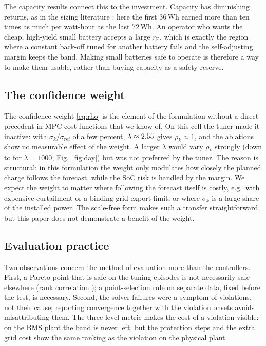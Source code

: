 \documentclass[a4paper,fleqn]{cas-dc}
\newcommand{\rE}{r_{\mathrm{E}}}
\begin{document}
The capacity results connect this to the investment. Capacity has diminishing returns, as in the sizing literature \cite{weniger2014sizing,quoilin2016quantifying,mulleriyawage2020optimally}: here the first 36\,Wh earned more than ten times as much per watt-hour as the last 72\,Wh. An operator who wants the cheap, high-yield small battery accepts a large $\rE$, which is exactly the region where a constant back-off tuned for another battery fails and the self-adjusting margin keeps the band. Making small batteries safe to operate is therefore a way to make them usable, rather than buying capacity as a safety reserve.

\subsection{The confidence weight}\label{sec:disc:rho}
The confidence weight \eqref{eq:rho} is the element of the formulation without a direct precedent in MPC cost functions that we know of. On this cell the tuner made it inactive: with $\sigma_k/\sigma_{\mathrm{ref}}$ of a few percent, $\lambda\approx2.55$ gives $\rho_k\approx1$, and the ablations show no measurable effect of the weight. A larger $\lambda$ would vary $\rho_k$ strongly (down to \rhoMinDefault for $\lambda=1000$, Fig.~\ref{fig:day}) but was not preferred by the tuner. The reason is structural: in this formulation the weight only modulates how closely the planned charge follows the forecast, while the SoC risk is handled by the margin. We expect the weight to matter where following the forecast itself is costly, e.g.\ with expensive curtailment or a binding grid-export limit, or where $\sigma_k$ is a large share of the installed power. The scale-free form makes such a transfer straightforward, but this paper does not demonstrate a benefit of the weight.

\subsection{Evaluation practice}
Two observations concern the method of evaluation more than the controllers. First, a Pareto point that is safe on the tuning episodes is not necessarily safe elsewhere (rank correlation \rankCorr); a point-selection rule on separate data, fixed before the test, is necessary. Second, the solver failures were a symptom of violations, not their cause; reporting convergence together with the violation onsets avoids misattributing them. The three-level metric makes the cost of a violation visible: on the BMS plant the band is never left, but the protection steps and the extra grid cost show the same ranking as the violation on the physical plant.
\end{document}
